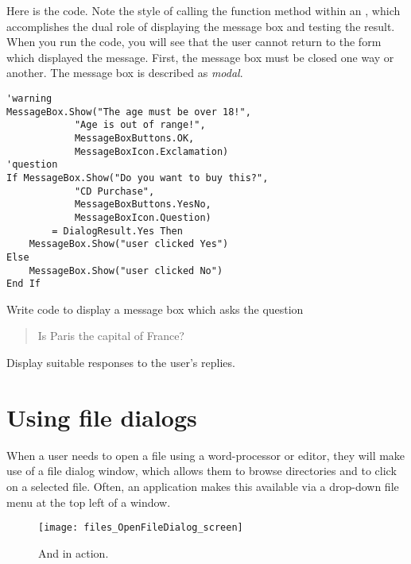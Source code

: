 		Here is the code. Note the style of calling the function method within an , which accomplishes the dual role of displaying the message box and testing the result. When you run the code, you will see that the user cannot return to the form which displayed the message. First, the message box must be closed one way or another. The message box is described as \emph{modal}.
		\begin{lstlisting}
'warning
MessageBox.Show("The age must be over 18!",
			"Age is out of range!",
			MessageBoxButtons.OK,
			MessageBoxIcon.Exclamation)
'question
If MessageBox.Show("Do you want to buy this?",
			"CD Purchase",
			MessageBoxButtons.YesNo,
			MessageBoxIcon.Question)
		= DialogResult.Yes Then
	MessageBox.Show("user clicked Yes")
Else
	MessageBox.Show("user clicked No")
End If
		\end{lstlisting}


		\begin{stqb}
			\begin{STQ}
				\item Write code to display a message box which asks the question
					\begin{quote}
Is Paris the capital of France?
					\end{quote}
					Display suitable responses to the user's replies.
			\end{STQ}
		\end{stqb}


	\section{Using file dialogs}
		When a user needs to open a file using a word-processor or editor, they will make use of a file dialog window, which allows them to browse directories and to click on a selected file. Often, an application makes this available via a drop-down file menu at the top left of a window.
		\begin{figure}[tbh]
			\centering
			\texttt{[image: files\_OpenFileDialog\_screen]}
			\caption{And  in action.}
			\label{fig:files_OpenFileDialog_screen}
		\end{figure}
		
